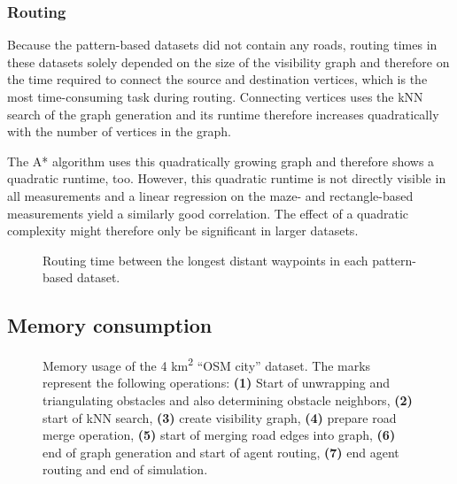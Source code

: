		\subsubsection{Routing}
		
			Because the pattern-based datasets did not contain any roads, routing times in these datasets solely depended on the size of the visibility graph and therefore on the time required to connect the source and destination vertices, which is the most time-consuming task during routing.
			Connecting vertices uses the kNN search of the graph generation and its runtime therefore increases quadratically with the number of vertices in the graph.
			
			The A* algorithm uses this quadratically growing graph and therefore shows a quadratic runtime, too.
			However, this quadratic runtime is not directly visible in all measurements and a linear regression on the maze- and rectangle-based measurements yield a similarly good correlation.
			The effect of a quadratic complexity might therefore only be significant in larger datasets.
			
			\begin{figure}[h!]
				\hspace{-20pt}
				
				\caption{Routing time between the longest distant waypoints in each pattern-based dataset.}
				\label{fig:eval-pattern-routing-details}
			\end{figure}
			
	\subsection{Memory consumption}
	\label{subsec:memory-consumption}
	
		\begin{figure}[h]
			\begin{figcenter}
				
			\end{figcenter}
			\caption[Memory usage of the 4 km\textsuperscript{2} \enquote{OSM city} dataset]{Memory usage of the 4 km\textsuperscript{2} \enquote{OSM city} dataset. The marks represent the following operations: \textbf{(1)} Start of unwrapping and triangulating obstacles and also determining obstacle neighbors, \textbf{(2)} start of kNN search, \textbf{(3)} create visibility graph, \textbf{(4)} prepare road merge operation, \textbf{(5)} start of merging road edges into graph, \textbf{(6)} end of graph generation and start of agent routing, \textbf{(7)} end agent routing and end of simulation.}
			\label{fig:eval-memory-usage}
		\end{figure}
	
